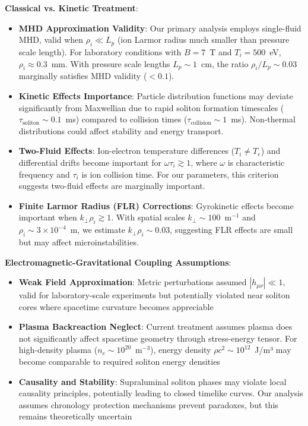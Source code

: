\documentclass[10pt,twocolumn]{article}
\begin{document}
\textbf{Classical vs. Kinetic Treatment}:
\begin{itemize}
\item \textbf{MHD Approximation Validity}: Our primary analysis employs single-fluid MHD, valid when $\rho_i \ll L_p$ (ion Larmor radius much smaller than pressure scale length). For laboratory conditions with $B = 7$~T and $T_i = 500$~eV, $\rho_i \approx 0.3$~mm. With pressure scale lengths $L_p \sim 1$~cm, the ratio $\rho_i/L_p \sim 0.03$ marginally satisfies MHD validity ($< 0.1$).
\item \textbf{Kinetic Effects Importance}: Particle distribution functions may deviate significantly from Maxwellian due to rapid soliton formation timescales ($\tau_{\text{soliton}} \sim 0.1$~ms) compared to collision times ($\tau_{\text{collision}} \sim 1$~ms). Non-thermal distributions could affect stability and energy transport.
\item \textbf{Two-Fluid Effects}: Ion-electron temperature differences ($T_i \neq T_e$) and differential drifts become important for $\omega \tau_i \gtrsim 1$, where $\omega$ is characteristic frequency and $\tau_i$ is ion collision time. For our parameters, this criterion suggests two-fluid effects are marginally important.
\item \textbf{Finite Larmor Radius (FLR) Corrections}: Gyrokinetic effects become important when $k_\perp \rho_i \gtrsim 1$. With spatial scales $k_\perp \sim 100$~m$^{-1}$ and $\rho_i \sim 3 \times 10^{-4}$~m, we estimate $k_\perp \rho_i \sim 0.03$, suggesting FLR effects are small but may affect microinstabilities.
\end{itemize}

\textbf{Electromagnetic-Gravitational Coupling Assumptions}:
\begin{itemize}
\item \textbf{Weak Field Approximation}: Metric perturbations assumed $|h_{\mu\nu}| \ll 1$, valid for laboratory-scale experiments but potentially violated near soliton cores where spacetime curvature becomes appreciable
\item \textbf{Plasma Backreaction Neglect}: Current treatment assumes plasma does not significantly affect spacetime geometry through stress-energy tensor. For high-density plasma ($n_e \sim 10^{20}$~m$^{-3}$), energy density $\rho c^2 \sim 10^{12}$~J/m³ may become comparable to required soliton energy densities
\item \textbf{Causality and Stability}: Supraluminal soliton phases may violate local causality principles, potentially leading to closed timelike curves. Our analysis assumes chronology protection mechanisms prevent paradoxes, but this remains theoretically uncertain
\end{itemize}
\end{document}
